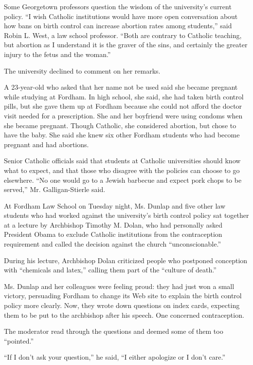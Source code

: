 Some Georgetown professors question the wisdom of the university's
current policy. ``I wish Catholic institutions would have more open
conversation about how bans on birth control can increase abortion rates
among students,'' said Robin L. West, a law school professor. ``Both are
contrary to Catholic teaching, but abortion as I understand it is the
graver of the sins, and certainly the greater injury to the fetus and
the woman.''

The university declined to comment on her remarks.

A 23-year-old who asked that her name not be used said she became
pregnant while studying at Fordham. In high school, she said, she had
taken birth control pills, but she gave them up at Fordham because she
could not afford the doctor visit needed for a prescription. She and her
boyfriend were using condoms when she became pregnant. Though Catholic,
she considered abortion, but chose to have the baby. She said she knew
six other Fordham students who had become pregnant and had abortions.

Senior Catholic officials said that students at Catholic universities
should know what to expect, and that those who disagree with the
policies can choose to go elsewhere. ``No one would go to a Jewish
barbecue and expect pork chops to be served,'' Mr. Galligan-Stierle
said.

At Fordham Law School on Tuesday night, Ms. Dunlap and five other law
students who had worked against the university's birth control policy
sat together at a lecture by Archbishop Timothy M. Dolan, who had
personally asked President Obama to exclude Catholic institutions from
the contraception requirement and called the decision against the church
``unconscionable.''

During his lecture, Archbishop Dolan criticized people who postponed
conception with ``chemicals and latex,'' calling them part of the
``culture of death.''

Ms. Dunlap and her colleagues were feeling proud: they had just won a
small victory, persuading Fordham to change its Web site to explain the
birth control policy more clearly. Now, they wrote down questions on
index cards, expecting them to be put to the archbishop after his
speech. One concerned contraception.

The moderator read through the questions and deemed some of them too
``pointed.''

``If I don't ask your question,'' he said, ``I either apologize or I
don't care.''

